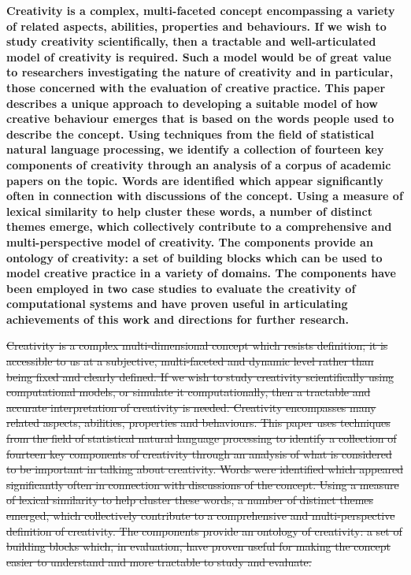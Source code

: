 \documentclass[10pt,letterpaper]{article}
\begin{document}
\textbf{Creativity is a complex, multi-faceted concept encompassing a variety of related aspects, abilities, properties and behaviours. If we wish to study creativity scientifically, then a tractable and well-articulated model of creativity is required. Such a model would be of great value to researchers investigating the nature of creativity and in particular, those concerned with the evaluation of creative practice. This paper describes a unique approach to developing a suitable model of how creative behaviour emerges that is based on the words people used to describe the concept. Using techniques from the field of statistical natural language processing, we identify a collection of fourteen key components of creativity through an analysis of a corpus of academic papers on the topic. Words are identified which appear significantly often in connection with discussions of the concept. Using a measure of lexical similarity to help cluster these words, a number of distinct themes emerge, which collectively contribute to a comprehensive and multi-perspective model of creativity. The components provide an ontology of creativity: a set of building blocks which can be used to model creative practice in a variety of domains. The components have been employed in two case studies to evaluate the creativity of computational systems and have proven useful in articulating achievements of this work and directions for further research. }

\sout{
Creativity is a complex multi-dimensional concept which resists definition; it is accessible to us at a subjective, multi-faceted and dynamic level rather than being fixed and clearly defined. If we wish to study creativity scientifically using computational models, or simulate it computationally, then a tractable and accurate interpretation of creativity is needed. Creativity encompasses many related aspects, abilities, properties and behaviours. This paper uses techniques from the field of statistical natural language processing to identify a collection of fourteen key components of creativity through an analysis of what is considered to be important in talking about creativity. Words were identified which appeared significantly often in connection with discussions of the concept. Using a measure of lexical similarity to help cluster these words, a number of distinct themes emerged, which collectively contribute to a comprehensive and multi-perspective definition of creativity. The components provide an ontology of creativity: a set of building blocks which, in evaluation, have proven useful for making the concept easier to understand and more tractable to study and evaluate.}
\end{document}
